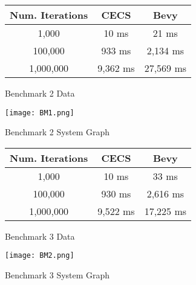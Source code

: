 \documentclass[conference]{IEEEtran}
\begin{document}
\begin{figure}[!htb]
    \begin{center}
    
    \begin{tabular}{||c c c||} 
    \hline
    Num. Iterations & CECS & Bevy  \\ [0.5ex] 
    \hline\hline
    1,000 & 10 ms & 21 ms \\ 
    \hline
    100,000 & 933 ms & 2,134 ms \\
    \hline
    1,000,000 & 9,362 ms & 27,569 ms \\
    \hline
    \end{tabular}
    
    \caption[test]{Benchmark 2 Data}
    \label{Benchmark 2 Data}
    \end{center}
\end{figure}

\begin{figure}[!htb]
    \begin{center}
    \centerline{\texttt{[image: BM1.png]}}
    \caption[test]{Benchmark 2 System Graph}
    \label{Benchmark 2 System Graph}
    \end{center}
\end{figure}

\begin{figure}[!htb]
    \begin{center}
    
    \begin{tabular}{||c c c||} 
    \hline
    Num. Iterations & CECS & Bevy  \\ [0.5ex] 
    \hline\hline
    1,000 & 10 ms & 33 ms \\ 
    \hline
    100,000 & 930 ms & 2,616 ms \\
    \hline
    1,000,000 & 9,522 ms & 17,225 ms \\
    \hline
    \end{tabular}
    
    \caption[test]{Benchmark 3 Data}
    \label{Benchmark 3 Data}
    \end{center}
\end{figure}

\begin{figure}[!htb]
    \begin{center}
    \centerline{\texttt{[image: BM2.png]}}
    \caption[test]{Benchmark 3 System Graph}
    \label{Benchmark 3 System Graph}
    \end{center}
\end{figure}
\end{document}

